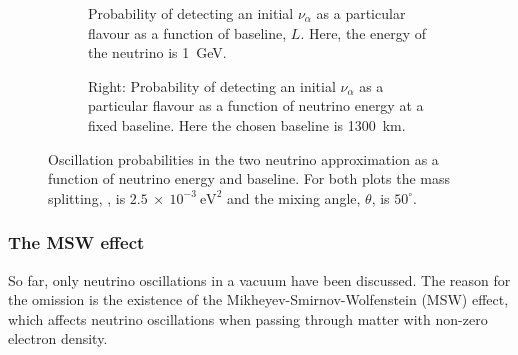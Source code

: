 \begin{figure}[h]
  \centering
  \begin{subfigure}[t]{0.49\textwidth}
    \begin{adjustbox}{max totalsize={\textwidth}, center}
      
    \end{adjustbox}
    \caption{Probability of detecting an initial $\nu_{\alpha}$ as a particular flavour as a function of baseline, $L$. Here, the energy of the neutrino is 1~GeV.}
  \end{subfigure}
  \hfill
  \begin{subfigure}[t]{0.49\textwidth}
    \begin{adjustbox}{max totalsize={\textwidth}, center}
      
    \end{adjustbox}
    \caption{Right: Probability of detecting an initial $\nu_{\alpha}$ as a particular flavour as a function of neutrino energy at a fixed baseline. Here the chosen baseline is 1300~km.}
  \end{subfigure}
  \caption[Two neutrino oscillation probabilities.]{Oscillation probabilities in the two neutrino approximation as a function of neutrino energy and baseline. For both plots the mass splitting, \deltam{}{}, is $2.5~\times~10^{-3}~\text{eV}^{2}$ and the mixing angle, $\theta$, is $50^{\circ}$.}
  \label{fig:twoNeutrino}
\end{figure}

\subsubsection{The MSW effect}
\label{sec:theory:theory:msw}
So far, only neutrino oscillations in a vacuum have been discussed.
The reason for the omission is the existence of the Mikheyev-Smirnov-Wolfenstein (MSW) effect, which affects neutrino oscillations when passing through matter with non-zero electron density.

